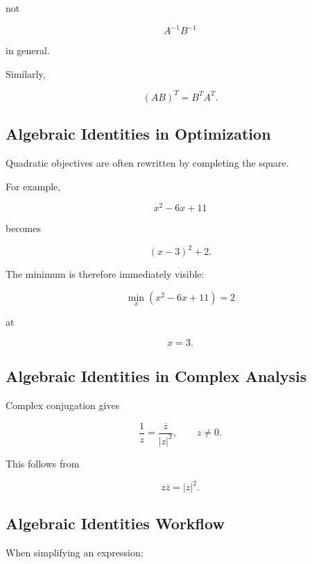 not

\[
A^{-1}B^{-1}
\]

in general.

Similarly,

\[
\boxed{
(AB)^T
=
B^TA^T.
}
\]

\subsection{Algebraic Identities in Optimization}
\label{subsec:algebraic-identities-optimization}

Quadratic objectives are often rewritten by completing the square.

For example,

\[
x^2-6x+11
\]

becomes

\[
\boxed{
(x-3)^2+2.
}
\]

The minimum is therefore immediately visible:

\[
\boxed{
\min_x
(x^2-6x+11)
=
2
}
\]

at

\[
\boxed{
x=3.
}
\]

\subsection{Algebraic Identities in Complex Analysis}
\label{subsec:algebraic-identities-complex-analysis}

Complex conjugation gives

\[
\boxed{
\frac{1}{z}
=
\frac{\overline z}{|z|^2},
\qquad
z\neq0.
}
\]

This follows from

\[
z\overline z
=
|z|^2.
\]

\subsection{Algebraic Identities Workflow}
\label{subsec:algebraic-identities-workflow}

When simplifying an expression:

